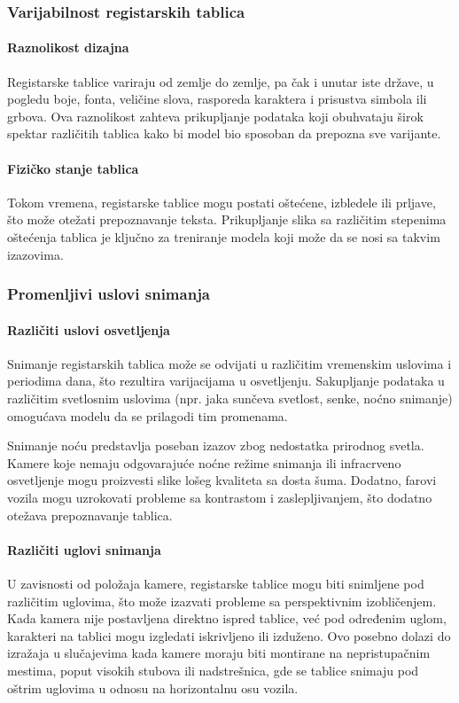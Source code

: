 \documentclass[a4paper,12pt]{article}
\begin{document}
	\subsubsection{Varijabilnost registarskih tablica}
	\paragraph{Raznolikost dizajna}
	Registarske tablice variraju od zemlje do zemlje, pa čak i unutar iste države, u pogledu boje, fonta, veličine slova, rasporeda karaktera i prisustva simbola ili grbova. Ova raznolikost zahteva prikupljanje podataka koji obuhvataju širok spektar različitih tablica kako bi model bio sposoban da prepozna sve varijante.
	
	\paragraph{Fizičko stanje tablica}
	Tokom vremena, registarske tablice mogu postati oštećene, izbledele ili prljave, što može otežati prepoznavanje teksta. Prikupljanje slika sa različitim stepenima oštećenja tablica je ključno za treniranje modela koji može da se nosi sa takvim izazovima.
	
	\subsubsection{Promenljivi uslovi snimanja}
	\paragraph{Različiti uslovi osvetljenja}
	Snimanje registarskih tablica može se odvijati u različitim vremenskim uslovima i periodima dana, što rezultira varijacijama u osvetljenju. Sakupljanje podataka u različitim svetlosnim uslovima (npr. jaka sunčeva svetlost, senke, noćno snimanje) omogućava modelu da se prilagodi tim promenama.
	
	Snimanje noću predstavlja poseban izazov zbog nedostatka prirodnog svetla. Kamere koje nemaju odgovarajuće noćne režime snimanja ili infracrveno osvetljenje mogu proizvesti slike lošeg kvaliteta sa dosta šuma. Dodatno, farovi vozila mogu uzrokovati probleme sa kontrastom i zaslepljivanjem, što dodatno otežava prepoznavanje tablica.
	
	\paragraph{Različiti uglovi snimanja}
	U zavisnosti od položaja kamere, registarske tablice mogu biti snimljene pod različitim uglovima, što može izazvati probleme sa perspektivnim izobličenjem. Kada kamera nije postavljena direktno ispred tablice, već pod određenim uglom, karakteri na tablici mogu izgledati iskrivljeno ili izduženo. Ovo posebno dolazi do izražaja u slučajevima kada kamere moraju biti montirane na nepristupačnim mestima, poput visokih stubova ili nadstrešnica, gde se tablice snimaju pod oštrim uglovima u odnosu na horizontalnu osu vozila.
	
\end{document}
